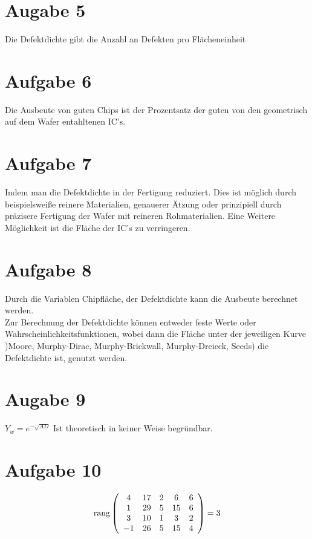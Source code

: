 \documentclass[a4paper]{scrartcl}
\begin{document}
\section*{Augabe 5}
Die Defektdichte gibt die Anzahl an Defekten pro Flächeneinheit 


\section*{Aufgabe 6}
Die Ausbeute von guten Chips ist der Prozentsatz der guten von den geometrisch auf dem Wafer entahltenen IC's.


\section*{Aufgabe 7}
Indem man die Defektdichte in der Fertigung reduziert. Dies ist möglich durch beispielsweiße reinere Materialien, genauerer Ätzung oder prinzipiell durch präzisere Fertigung  der Wafer mit reineren Rohmaterialien. Eine Weitere Möglichkeit ist die Fläche der IC's zu verringeren.


\section*{Aufgabe 8}
Durch die Variablen Chipfläche, der Defektdichte kann die Ausbeute berechnet werden.\\
Zur Berechnung der Defektdichte können entweder feste Werte oder Wahrscheinlichkeitsfunktionen, wobei dann die Fläche unter der jeweiligen Kurve )Moore, Murphy-Dirac, Murphy-Brickwall, Murphy-Dreieck, Seeds) die Defektdichte ist, genutzt werden.

\section*{Augabe 9}
$Y_w = e^{-\sqrt{AD}}$
Ist theoretisch in keiner Weise begründbar.


\section*{Aufgabe 10}


$$\operatorname { rang } \left( \begin{array} { c c c c c } { 4 } & { 17 } & { 2 } & { 6 } & { 6 } \\ { 1 } & { 29 } & { 5 } & { 15 } & { 6 } \\ { 3 } & { 10 } & { 1 } & { 3 } & { 2 } \\ { - 1 } & { 26 } & { 5 } & { 15 } & { 4 } \end{array} \right) = 3$$
\end{document}
